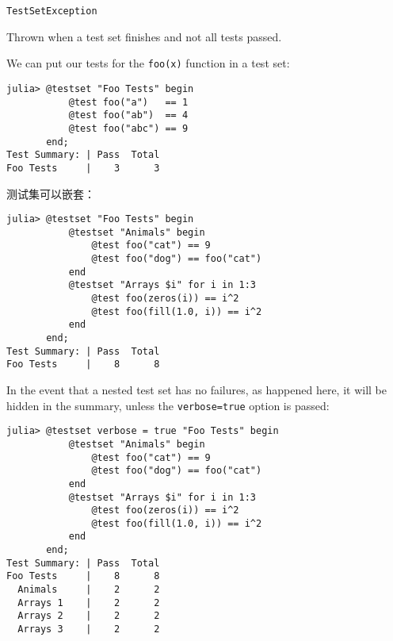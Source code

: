 \begin{adjustwidth}{2em}{0pt}


\begin{verbatim}
TestSetException
\end{verbatim}

Thrown when a test set finishes and not all tests passed.



\end{adjustwidth}

We can put our tests for the \texttt{foo(x)} function in a test set:




\begin{verbatim}
julia> @testset "Foo Tests" begin
           @test foo("a")   == 1
           @test foo("ab")  == 4
           @test foo("abc") == 9
       end;
Test Summary: | Pass  Total
Foo Tests     |    3      3
\end{verbatim}



测试集可以嵌套：




\begin{verbatim}
julia> @testset "Foo Tests" begin
           @testset "Animals" begin
               @test foo("cat") == 9
               @test foo("dog") == foo("cat")
           end
           @testset "Arrays $i" for i in 1:3
               @test foo(zeros(i)) == i^2
               @test foo(fill(1.0, i)) == i^2
           end
       end;
Test Summary: | Pass  Total
Foo Tests     |    8      8
\end{verbatim}



In the event that a nested test set has no failures, as happened here, it will be hidden in the summary, unless the \texttt{verbose=true} option is passed:




\begin{verbatim}
julia> @testset verbose = true "Foo Tests" begin
           @testset "Animals" begin
               @test foo("cat") == 9
               @test foo("dog") == foo("cat")
           end
           @testset "Arrays $i" for i in 1:3
               @test foo(zeros(i)) == i^2
               @test foo(fill(1.0, i)) == i^2
           end
       end;
Test Summary: | Pass  Total
Foo Tests     |    8      8
  Animals     |    2      2
  Arrays 1    |    2      2
  Arrays 2    |    2      2
  Arrays 3    |    2      2
\end{verbatim}



